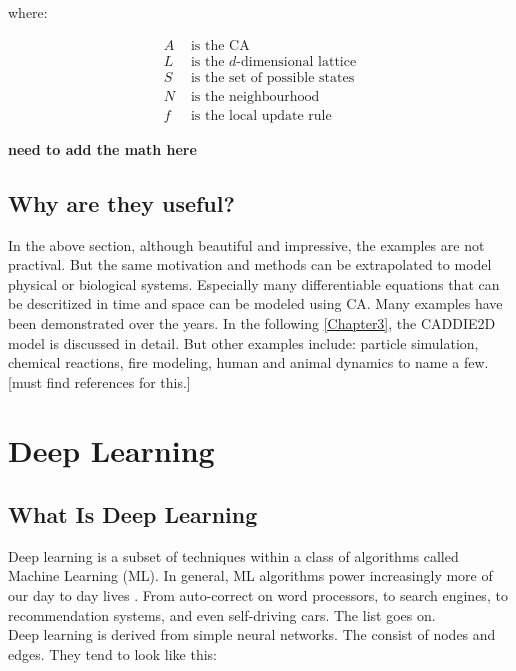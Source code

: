 where:

\begin{align*}
	A &  \text{ is the CA} \\
	L &  \text{ is the } d \text{-dimensional lattice} \\
	S &  \text{ is the set of possible states} \\
	N &  \text{ is the neighbourhood} \\
	f &  \text{ is the local update rule}
\end{align*}

\textbf{need to add the math here}
\subsection{Why are they useful?}
In the above section, although beautiful and impressive, the examples are not practival. But the same motivation and methods can be extrapolated to model physical or biological systems. Especially many differentiable equations that can be descritized in time and space can be modeled using CA. Many examples have been demonstrated over the years. In the following \ref{Chapter3}, the CADDIE2D model is discussed in detail. But other examples include: particle simulation, chemical reactions, fire modeling, human and animal dynamics to name a few. [must find references for this.]

\section{Deep Learning}
\subsection{What Is Deep Learning}

Deep learning is a subset of techniques within a class of algorithms called Machine Learning (ML). In general, ML algorithms power increasingly more of our day to day lives \cite{lecun2015deep}. From auto-correct on word processors, to search engines, to recommendation systems, and even self-driving cars. The list goes on. \\

Deep learning is derived from simple neural networks. The consist of nodes and edges. They tend to look like this:

\newcommand{\inputnum}{3} 

\newcommand{\hiddennum}{5}  

\newcommand{\outputnum}{2} 


